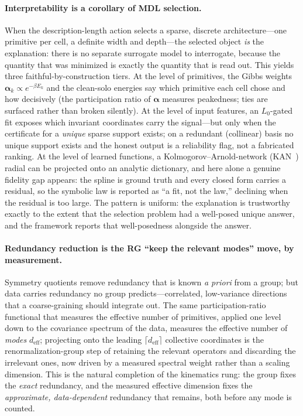 \documentclass[11pt]{article}
\theoremstyle{definition}
\begin{document}
\paragraph{Interpretability is a corollary of MDL selection.} When the description-length action selects a
sparse, discrete architecture---one primitive per cell, a definite width and depth---the selected object
\emph{is} the explanation: there is no separate surrogate model to interrogate, because the quantity that was
minimized is exactly the quantity that is read out. This yields three faithful-by-construction tiers. At the
level of primitives, the Gibbs weights $\bm{\alpha}_k\propto e^{-\beta E_k}$ and the clean-solo energies say which
primitive each cell chose and how decisively (the participation ratio of $\bm{\alpha}$ measures peakedness; ties
are surfaced rather than broken silently). At the level of input features, an $L_0$-gated fit exposes which
invariant coordinates carry the signal---but only when the certificate for a \emph{unique} sparse support
exists; on a redundant (collinear) basis no unique support exists and the honest output is a reliability flag,
not a fabricated ranking. At the level of learned functions, a Kolmogorov--Arnold-network (KAN~\cite{liu2024kan,kolmogorov1957}) radial can be projected onto an analytic
dictionary, and here alone a genuine fidelity gap appears: the spline is ground truth and every closed form
carries a residual, so the symbolic law is reported as ``a fit, not the law,'' declining when the residual is
too large. The pattern is uniform: the explanation is trustworthy exactly to the extent that the selection
problem had a well-posed unique answer, and the framework reports that well-posedness alongside the answer.

\paragraph{Redundancy reduction is the RG ``keep the relevant modes'' move, by measurement.} Symmetry
quotients remove redundancy that is known \emph{a priori} from a group; but data carries redundancy no group
predicts---correlated, low-variance directions that a coarse-graining should integrate out. The same
participation-ratio functional that measures the effective number of primitives, applied one level down to the
covariance spectrum of the data, measures the effective number of \emph{modes} $d_{\mathrm{eff}}$; projecting
onto the leading $\lceil d_{\mathrm{eff}}\rceil$ collective coordinates is the renormalization-group step of
retaining the relevant operators and discarding the irrelevant ones, now driven by a measured spectral weight
rather than a scaling dimension. This is the natural completion of the kinematics rung: the group fixes the
\emph{exact} redundancy, and the measured effective dimension fixes the \emph{approximate, data-dependent}
redundancy that remains, both before any mode is counted.
\end{document}
